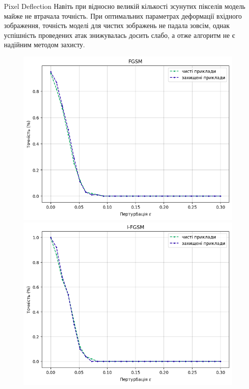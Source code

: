 \documentclass[aspectratio=169]{beamer}
\begin{document}
	\begin{frame}{Pixel Deflection}
		Навіть при відносно великій кількості зсунутих пікселів модель майже не втрачала точність. При оптимальних параметрах деформації вхідного зображення, точність моделі для чистих зображень не падала зовсім, однак успішність проведених атак знижувалась досить слабо, а отже алгоритм не є надійним методом захисту.
		
		\begin{figure}[!htb]
			\includegraphics[width=1\textwidth]{../CourseWorkLatex/resources/fgsm_defl_defence.png}
			\endminipage\hfill
			\includegraphics[width=1\textwidth]{../CourseWorkLatex/resources/ifgsm_defl_defence.png}

\end{figure}
\end{frame}
\end{document}
